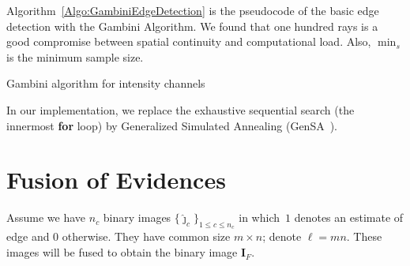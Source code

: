 \documentclass[journal]{IEEEtran}
\begin{document}
Algorithm~\ref{Algo:GambiniEdgeDetection} is the pseudocode of the basic edge detection with the Gambini Algorithm.
We found that one hundred rays is a good compromise between spatial continuity and computational load.
Also, $\min_s$ is the minimum sample size.%

\begin{algorithm}[hbt]
\SetAlgoLined
{}
\caption{Gambini algorithm for intensity channels}\label{Algo:GambiniEdgeDetection}
\end{algorithm}

In our implementation, we replace the exhaustive sequential search (the innermost \textbf{for} loop) by Generalized Simulated Annealing (GenSA~\cite{xgsh}).


\section{Fusion of Evidences}\label{sec_04}

Assume we have $n_c$ binary images $\{\widehat{\bm\jmath}_c\}_{1\leq c\leq n_c}$ in which~$1$ denotes an estimate of edge and $0$ otherwise.
They have common size $m\times n$; denote $\ell=mn$.
These images will be fused to obtain the binary image $\bm I_F$.

\end{document}
